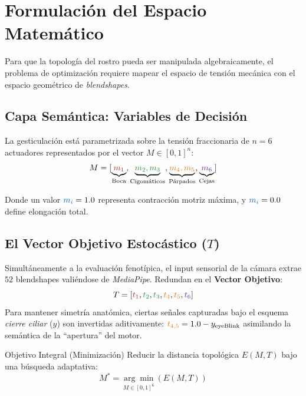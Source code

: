 \documentclass[11pt, a4paper, twocolumn]{article}
\begin{document}
\section{Formulación del Espacio Matemático}

Para que la topología del rostro pueda ser manipulada algebraicamente, el problema de optimización requiere mapear el espacio de tensión mecánica con el espacio geométrico de \textit{blendshapes}.

\subsection{Capa Semántica: Variables de Decisión}
La gesticulación está parametrizada sobre la tensión fraccionaria de $n=6$ actuadores representados por el vector \textcolor{coreblue}{$M \in [0, 1]^n$}:
$$
M = [ \underbrace{\textcolor{corered}{m_1}}_{\text{Boca}}, \underbrace{\textcolor{coregreen}{m_2, m_3}}_{\text{Cigomáticos}}, \underbrace{\textcolor{coreorange}{m_4, m_5}}_{\text{Párpados}}, \underbrace{\textcolor{corepurple}{m_6}}_{\text{Cejas}} ]
$$

Donde un valor $\textcolor{coreblue}{m_i} = 1.0$ representa contracción motriz máxima, y $\textcolor{coreblue}{m_i} = 0.0$ define elongación total.

\subsection{El Vector Objetivo Estocástico ($T$)}
Simultáneamente a la evaluación fenotípica, el input sensorial de la cámara extrae $52$ blendshapes valiéndose de \textit{MediaPipe}. Redundan en el \textbf{Vector Objetivo}:
$$
T = [ \textcolor{corered}{t_1}, \textcolor{coregreen}{t_2}, \textcolor{coregreen}{t_3}, \textcolor{coreorange}{t_4}, \textcolor{coreorange}{t_5}, \textcolor{corepurple}{t_6} ]
$$
Para mantener simetría anatómica, ciertas señales capturadas bajo el esquema \textit{cierre ciliar} ($y$) son invertidas aditivamente: $\textcolor{coreorange}{t_{4,5}} = 1.0 - y_{\text{eyeBlink}}$ asimilando la semántica de la ``apertura'' del motor.

\begin{mathdef}{Objetivo Integral (Minimización)}
Reducir la distancia topológica $E(M, T)$ bajo una búsqueda adaptativa:
\begin{equation}
M^* = \underset{M \in [0,1]^6}{\arg\min} \left( E(M, T) \right)
\end{equation}
\end{mathdef}
\end{document}
